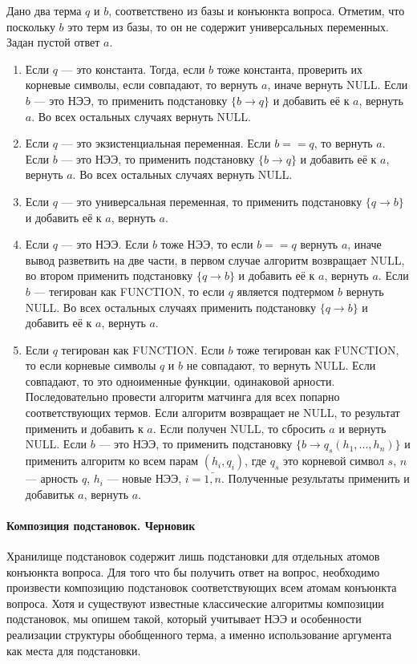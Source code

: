 Дано два терма $q$ и $b$, соответствено из базы и конъюнкта вопроса. Отметим, что поскольку $b$ это терм из базы, то он не содержит универсальных переменных. Задан пустой ответ $a$.
\begin{enumerate}
\item Если $q$ --- это константа. Тогда, если $b$ тоже константа, проверить их корневые символы, если совпадают, то вернуть $a$, иначе вернуть NULL. Если $b$ --- это НЭЭ, то применить подстановку $\{b \rightarrow q\}$ и добавить её к $a$, вернуть $a$. Во всех остальных случаях вернуть NULL.

\item Если $q$ --- это экзистенциальная переменная. Если $b==q$, то вернуть $a$. Если $b$ --- это НЭЭ, то применить подстановку $\{b \rightarrow q\}$ и добавить её к $a$, вернуть $a$. Во всех остальных случаях вернуть NULL.

\item Если $q$ --- это универсальная переменная, то применить подстановку $\{q \rightarrow b\}$ и добавить её к $a$, вернуть $a$.

\item Если $q$ --- это НЭЭ. Если $b$ тоже НЭЭ, то если $b==q$ вернуть $a$, иначе вывод разветвить на две части, в первом случае алгоритм возвращает NULL, во втором применить подстановку $\{q \rightarrow b\}$ и добавить её к $a$, вернуть $a$. Если $b$ --- тегирован как FUNCTION, то если $q$ является подтермом $b$ вернуть NULL. Во всех остальных случаях применить подстановку $\{q \rightarrow b\}$ и добавить её к $a$, вернуть $a$.

\item Если $q$ тегирован как FUNCTION. Если $b$ тоже тегирован как FUNCTION, то если корневые символы $q$ и $b$ не совпадают, то вернуть NULL. Если совпадают, то это одноименные функции, одинаковой арности. Последовательно провести алгоритм матчинга для всех попарно соответствующих термов. Если алгоритм возвращает не NULL, то результат применить и добавить к $a$. Если получен NULL, то сбросить $a$ и вернуть NULL. Если $b$ --- это НЭЭ, то применить подстановку $\{b \rightarrow q_s(h_1,...,h_n)\}$ и применить алгоритм ко всем парам $(h_i, q_i)$, где $q_s$ это корневой символ $s$, $n$ --- арность $q$, $h_i$ --- новые НЭЭ, $i = \bar{1,n}$. Полученные результаты применить и добавитьк  $a$, вернуть $a$.

\end{enumerate}

\paragraph{Композиция подстановок. Черновик}
Хранилище подстановок содержит лишь подстановки для отдельных атомов конъюнкта вопроса. Для того что бы получить ответ на вопрос, необходимо произвести композицию подстановок соответствующих всем атомам конъюнкта вопроса. Хотя и существуют известные классические алгоритмы композиции подстановок, мы опишем такой, который учитывает НЭЭ и  особенности реализации структуры обобщенного терма, а именно использование аргумента как места для подстановки.

